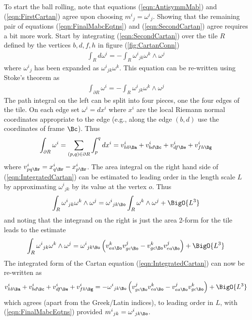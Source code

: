 \documentclass[a4paper,12pt]{article}
\numberwithin{equation}{section}
\begin{document}
To start the ball rolling, note that equations (\ref{eqn:AntisymmMab}) and
(\ref{eqn:FirstCartan}) agree upon choosing $m^i{}_j = \omega^i{}_j$. Showing that the
remaining pair of equations (\ref{eqn:FinalMabcEqtns}) and (\ref{eqn:SecondCartan}) agree
requires a bit more work. Start by integrating (\ref{eqn:SecondCartan}) over the tile $R$
defined by the vertices $b,d,f,h$ in figure (\ref{fig:CartanConn})
\begin{align}
   \int_R d\omega^i = - \int_R \omega^i{}_{jk} \omega^k \wedge \omega^j
\end{align}
where $\omega^i{}_j$ has been expanded as $\omega^i{}_{jk} \omega^k$.
This equation can be re-written using Stoke's theorem as
\begin{align}
   \label{eqn:IntegratedCartan}
   \int_{\partial R} \omega^i = - \int_R \omega^i{}_{jk} \omega^k \wedge \omega^j
\end{align}
The path integral on the left can be split into four pieces, one the four edges of the
tile. On each edge
set $\omega^i = dx^i$ where $x^i$ are the local Riemann normal coordinates appropriate to
the edge (e.g., along the edge $(b,d)$ use the coordinates of frame $\Bc$). Thus
\begin{align}
   \int_{\partial R} \omega^i
   = \sum_{(p,q)\in \partial R} \int_p^q dx^i
   = v^i_{hb\Ba} + v^i_{bd\Bc} + v^i_{df\Be} + v^i_{fh\Bg}
\end{align}
where $v^i_{pq\Br} = x^i_{q\Br}-x^i_{p\Br}$. The area integral on the
right hand side of (\ref{eqn:IntegratedCartan}) can be estimated to leading order in
the length scale $L$ by
approximating $\omega^i{}_{jk}$ by its value at the vertex $o$. Thus
\begin{align}
   \int_R \omega^i{}_{jk} \omega^k \wedge \omega^j
        = \omega^i{}_{jk\Bo} \int_R \omega^k \wedge \omega^j + \BigO{L^3}
\end{align}
and noting that the integrand on the right is just the area 2-form for the tile leads to
the estimate
\begin{align}
   \int_R \omega^i{}_{jk} \omega^k \wedge \omega^j
        = \omega^i{}_{jk\Bo} \left(  v^k_{ea\Bo} v^j_{gc\Bo}
                                   - v^k_{gc\Bo} v^j_{ea\Bo}\right) + \BigO{L^3}
\end{align}
The integrated form of the Cartan equation (\ref{eqn:IntegratedCartan}) can now be
re-written as
\begin{align}
   v^i_{hb\Ba} + v^i_{bd\Bc} + v^i_{df\Be} + v^i_{fh\Bg}
   =
   - \omega^i{}_{jk\Bo}  \left(  v^j_{gc\Bo} v^k_{ea\Bo}
                               - v^j_{ea\Bo} v^k_{gc\Bo} \right) + \BigO{L^3}
\end{align}
which agrees (apart from the Greek/Latin indices), to leading order in $L$, with
(\ref{eqn:FinalMabcEqtns}) provided $m^i{}_{jk} = \omega^i{}_{jk\Bo}$.
\end{document}
